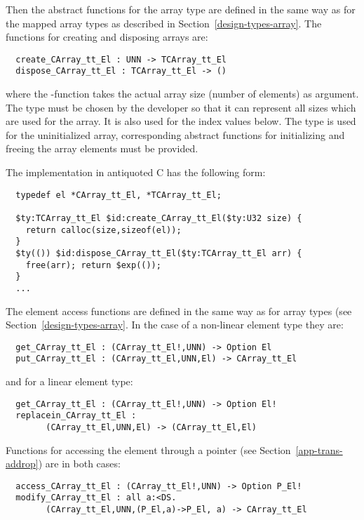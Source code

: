 Then the abstract functions for the array type are defined in the same way as for the mapped array types as described in
Section~\ref{design-types-array}. The functions for creating and disposing arrays are:
\begin{verbatim}
  create_CArray_tt_El : UNN -> TCArray_tt_El
  dispose_CArray_tt_El : TCArray_tt_El -> ()
\end{verbatim}
where the -function takes the actual array size (number of elements) as argument. The type  must be
chosen by the developer so that it can represent all sizes which are used for the array. It is also used for the index
values below. The type 
 is used for the uninitialized array, corresponding abstract functions for initializing
and freeing the array elements must be provided.

The implementation in antiquoted C has the following form:
\begin{verbatim}
  typedef el *CArray_tt_El, *TCArray_tt_El;
  
  $ty:TCArray_tt_El $id:create_CArray_tt_El($ty:U32 size) { 
    return calloc(size,sizeof(el));
  }
  $ty(()) $id:dispose_CArray_tt_El($ty:TCArray_tt_El arr) {
    free(arr); return $exp(());
  }
  ...
\end{verbatim}

The element access functions are defined in the same way as for array types (see Section~\ref{design-types-array}. 
In the case of a non-linear element type they are:
\begin{verbatim}
  get_CArray_tt_El : (CArray_tt_El!,UNN) -> Option El
  put_CArray_tt_El : (CArray_tt_El,UNN,El) -> CArray_tt_El
\end{verbatim}
and for a linear element type:
\begin{verbatim}
  get_CArray_tt_El : (CArray_tt_El!,UNN) -> Option El!
  replacein_CArray_tt_El : 
        (CArray_tt_El,UNN,El) -> (CArray_tt_El,El)
\end{verbatim}
Functions for accessing the element through a pointer (see Section~\ref{app-trans-addrop}) are in both cases:
\begin{verbatim}
  access_CArray_tt_El : (CArray_tt_El!,UNN) -> Option P_El!
  modify_CArray_tt_El : all a:<DS. 
        (CArray_tt_El,UNN,(P_El,a)->P_El, a) -> CArray_tt_El
\end{verbatim}

